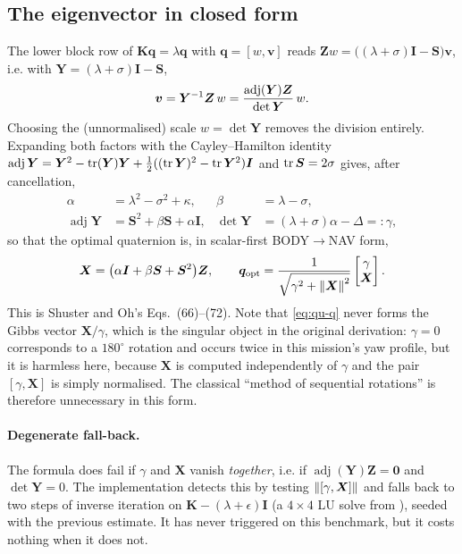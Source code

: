 \subsection{The eigenvector in closed form}
The lower block row of $\bm{K}\bm{q}=\lambda\bm{q}$ with $\bm{q}=[w,\bm{v}]$ reads
$\bm{Z}w=\big((\lambda+\sigma)\bm{I}-\bm{S}\big)\bm{v}$, i.e. with
$\bm{Y}=(\lambda+\sigma)\bm{I}-\bm{S}$,
\begin{equation}
\bm{v}=\bm{Y}^{-1}\bm{Z}\,w = \frac{\operatorname{adj}(\bm{Y})\bm{Z}}{\det\bm{Y}}\,w .
\label{eq:qu-eig}
\end{equation}
Choosing the (unnormalised) scale $w=\det\bm{Y}$ removes the division entirely. Expanding both
factors with the Cayley--Hamilton identity
$\operatorname{adj}\bm{Y}=\bm{Y}^2-\operatorname{tr}(\bm{Y})\bm{Y}+\tfrac12((\operatorname{tr}\bm{Y})^2-\operatorname{tr}\bm{Y}^2)\bm{I}$ and
$\operatorname{tr}\bm{S}=2\sigma$ gives, after cancellation,
\begin{align}
\alpha&=\lambda^2-\sigma^2+\kappa, &\beta&=\lambda-\sigma, \nonumber\\
\operatorname{adj}\bm{Y}&=\bm{S}^2+\beta\bm{S}+\alpha\bm{I}, &
\det\bm{Y}&=(\lambda+\sigma)\alpha-\Delta =: \gamma,
\label{eq:qu-adj}
\end{align}
so that the optimal quaternion is, in scalar-first BODY$\to$NAV form,
\begin{equation}
\bm{X}=\big(\alpha\bm{I}+\beta\bm{S}+\bm{S}^2\big)\bm{Z},
\qquad
\bm{q}_{\text{opt}} = \frac{1}{\sqrt{\gamma^2+\left\lVert \bm{X} \right\rVert^2}}\begin{bmatrix}\gamma\\ \bm{X}\end{bmatrix}.
\label{eq:qu-q}
\end{equation}
This is Shuster and Oh's Eqs.~(66)--(72). Note that \eqref{eq:qu-q} never forms the Gibbs vector
$\bm{X}/\gamma$, which is the singular object in the original derivation: $\gamma=0$ corresponds to
a $180^\circ$ rotation and occurs twice in this mission's yaw profile, but it is harmless here,
because $\bm{X}$ is computed independently of $\gamma$ and the pair $[\gamma,\bm{X}]$ is simply
normalised. The classical ``method of sequential rotations'' is therefore unnecessary in this form.

\paragraph{Degenerate fall-back.}\label{sec:qu-fallback} The formula does fail if $\gamma$ and $\bm{X}$ vanish
\emph{together}, i.e. if $\operatorname{adj}(\bm{Y})\bm{Z}=\bm{0}$ and $\det\bm{Y}=0$. The
implementation detects this by testing $\left\lVert [\gamma,\bm{X}] \right\rVert$ and falls back to two steps of
inverse iteration on $\bm{K}-(\lambda+\epsilon)\bm{I}$ (a $4\times4$ LU solve from
), seeded with the previous estimate. It has never triggered on this benchmark, but
it costs nothing when it does not.

